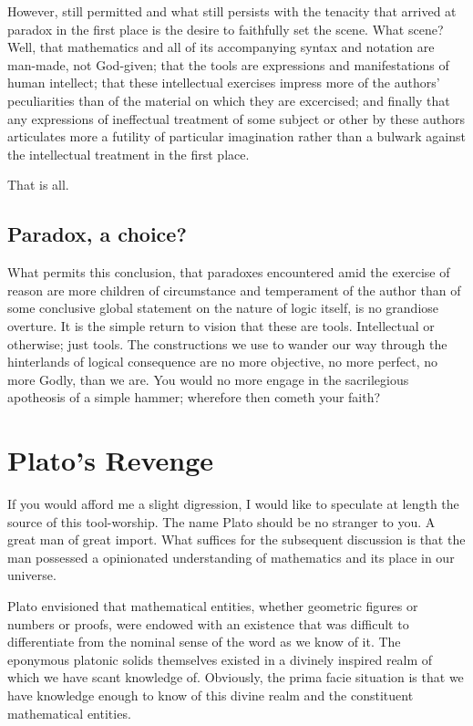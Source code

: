 \documentclass[11pt]{article}
\begin{document}
However, still permitted and what still persists with the tenacity that
arrived at paradox in the first place is the desire to faithfully set the
scene. What scene? Well, that mathematics and all of its accompanying syntax
and notation are man-made, not God-given; that the tools are expressions and
manifestations of human intellect; that these intellectual exercises impress
more of the authors' peculiarities than of the material on which they are
excercised; and finally that any expressions of ineffectual treatment of some
subject or other by these authors articulates more a futility of particular
imagination rather than a bulwark against the intellectual treatment in the
first place.

That is all.

\subsection{Paradox, a choice?}
\label{sec:org53dcf3e}

What permits this conclusion, that paradoxes encountered amid the exercise of
reason are more children of circumstance and temperament of the author than of
some conclusive global statement on the nature of logic itself, is no
grandiose overture. It is the simple return to vision that these are tools.
Intellectual or otherwise; just tools. The constructions we use to wander our
way through the hinterlands of logical consequence are no more objective, no
more perfect, no more Godly, than we are. You would no more engage in the
sacrilegious apotheosis of a simple hammer; wherefore then cometh your faith?

\section{Plato's Revenge}
\label{sec:orga48764c}

If you would afford me a slight digression, I would like to speculate at
length the source of this tool-worship. The name Plato should be no stranger
to you. A great man of great import. What suffices for the subsequent
discussion is that the man possessed a opinionated understanding of
mathematics and its place in our universe.

Plato envisioned that mathematical entities, whether geometric figures or
numbers or proofs, were endowed with an existence that was difficult to
differentiate from the nominal sense of the word as we know of it. The
eponymous platonic solids themselves existed in a divinely inspired realm of
which we have scant knowledge of. Obviously, the prima facie situation is that
we have knowledge enough to know of this divine realm and the constituent
mathematical entities.
\end{document}
